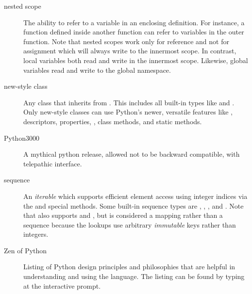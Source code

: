 \begin{description}
\item[nested scope]
The ability to refer to a variable in an enclosing definition.  For
instance, a function defined inside another function can refer to
variables in the outer function.  Note that nested scopes work only
for reference and not for assignment which will always write to the
innermost scope.  In contrast, local variables both read and write in
the innermost scope.  Likewise, global variables read and write to the
global namespace.

\item[new-style class]
Any class that inherits from .  This includes all
built-in types like  and .  Only new-style
classes can use Python's newer, versatile features like
{}, descriptors, properties,
, class methods, and static methods.

\item[Python3000]
A mythical python release, allowed not to be backward compatible, with
telepathic interface.

\item[sequence]
An \emph{iterable} which supports efficient element access using
integer indices via the  and
{} special methods.  Some built-in sequence types
are , , , and .
Note that  also supports  and
{}, but is considered a mapping rather than a
sequence because the lookups use arbitrary \emph{immutable} keys
rather than integers.

\item[Zen of Python]
Listing of Python design principles and philosophies that are helpful
in understanding and using the language.  The listing can be found by
typing  at the interactive prompt.

\end{description}
